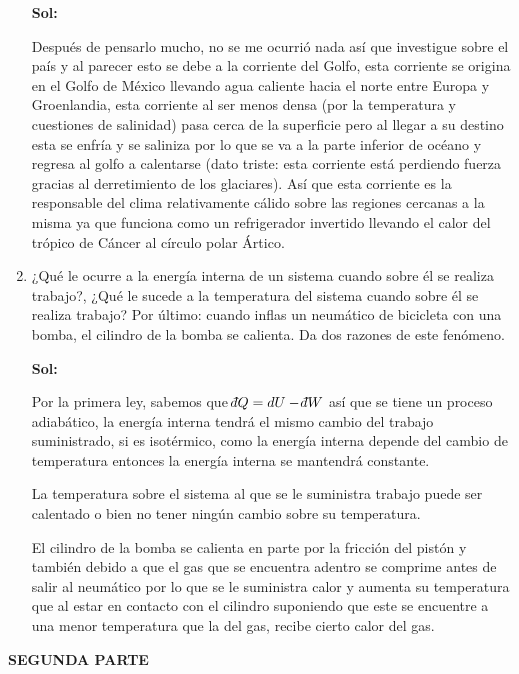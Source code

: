 \documentclass[12pt,a4paper]{article}
\newcommand{\dbar}{\mathchar'26\mkern-12mu d}
\begin{document}
\begin{enumerate}
\textbf{Sol:}

Después de pensarlo mucho, no se me ocurrió nada así que investigue sobre el país y al parecer esto se debe a la corriente del Golfo, esta corriente se origina en el Golfo de México llevando agua caliente hacia el norte entre Europa y Groenlandia, esta corriente al ser menos densa (por la temperatura y cuestiones de salinidad) pasa cerca de la superficie pero al llegar a su destino esta se enfría y se saliniza  por lo que se va a la parte inferior de océano y regresa al golfo a calentarse (dato triste: esta corriente está perdiendo fuerza gracias al derretimiento de los glaciares). Así que esta corriente es la responsable del clima relativamente cálido sobre las regiones cercanas a la misma ya que funciona como un refrigerador invertido llevando el calor del trópico de Cáncer al círculo polar Ártico.



\newpage



\item ¿Qué le ocurre a la energía interna de un sistema cuando sobre él se realiza trabajo?, ¿Qué le sucede a la temperatura del sistema cuando sobre él se realiza trabajo? Por último: cuando inflas un neumático de bicicleta con una bomba, el cilindro de la bomba se calienta. Da dos razones de este fenómeno.

\textbf{Sol:}

Por la primera ley, sabemos que $\dbar Q  = dU - \dbar W$ así que se tiene un proceso adiabático, la energía interna tendrá el mismo cambio del trabajo suministrado, si es isotérmico, como la energía interna depende del cambio de temperatura entonces la energía interna se mantendrá constante.

La temperatura sobre el sistema al que se le suministra trabajo puede ser calentado o bien no tener ningún cambio sobre su temperatura.


El cilindro de la bomba se calienta en parte por la fricción del pistón y también debido a que el gas que se encuentra adentro se comprime antes de salir al neumático por lo que se le suministra calor y aumenta su temperatura que al estar en contacto con el cilindro suponiendo que este se encuentre a una menor temperatura que la del gas, recibe cierto calor del gas.
    
\end{enumerate}


\textbf{SEGUNDA PARTE}
\end{document}
